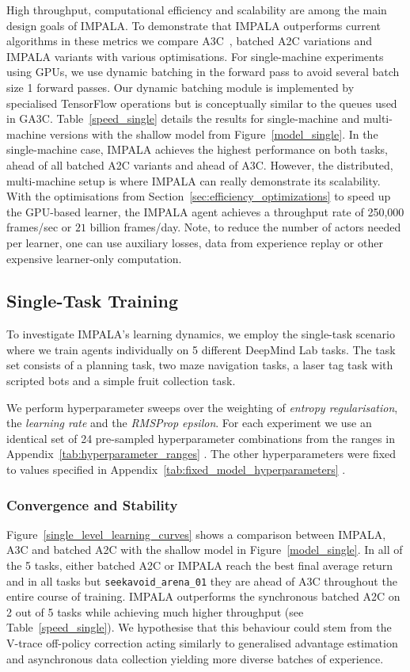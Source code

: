 High throughput, computational efficiency and scalability are among the main design goals of IMPALA.
To demonstrate that IMPALA outperforms current algorithms in these metrics we compare A3C~\cite{A3C2016}, batched A2C variations and IMPALA variants with various optimisations. For single-machine experiments using GPUs, we use dynamic batching in the forward pass to avoid several batch size 1 forward passes. Our dynamic batching module is implemented by specialised TensorFlow operations but is conceptually similar to the queues used in GA3C.
Table~\ref{speed_single} details the results for single-machine and multi-machine versions with the shallow model from Figure~\ref{model_single}.
In the single-machine case, IMPALA achieves the highest performance on both tasks, ahead of all batched A2C variants and ahead of A3C.
However, the distributed, multi-machine setup is where IMPALA can really demonstrate its scalability. With the optimisations from Section~\ref{sec:efficiency_optimizations} to speed up the GPU-based learner, the IMPALA agent achieves a throughput rate of 250,000 frames/sec or $21$ billion frames/day.
Note, to reduce the number of actors needed per learner, one can use auxiliary losses, data from experience replay or other expensive learner-only computation.


\subsection{Single-Task Training}

To investigate IMPALA's learning dynamics, we employ the single-task scenario where we train agents individually on 5 different DeepMind Lab tasks. The task set consists of a planning task, two maze navigation tasks, a laser tag task with scripted bots and a simple fruit collection task.

We perform hyperparameter sweeps over the weighting of \textit{entropy regularisation}, the \textit{learning rate} and the \textit{RMSProp epsilon}. For each experiment we use an identical set of 24 pre-sampled hyperparameter combinations from the ranges in Appendix~\ref{tab:hyperparameter_ranges}
. The other hyperparameters were fixed to values specified in Appendix~\ref{tab:fixed_model_hyperparameters}
.

\subsubsection{Convergence and Stability}


Figure~\ref{single_level_learning_curves} shows a comparison between IMPALA, A3C and batched A2C with the shallow model in Figure~\ref{model_single}.
In all of the 5 tasks, either batched A2C or IMPALA reach the best final average return and in all tasks but \texttt{seekavoid\_arena\_01} they are ahead of A3C throughout the entire course of training. IMPALA outperforms the synchronous batched A2C on 2 out of 5 tasks while achieving much higher throughput (see Table~\ref{speed_single}).
We hypothesise that this behaviour could stem from the V-trace off-policy correction acting similarly to generalised advantage estimation \cite{schulman2015high} and asynchronous data collection yielding more diverse batches of experience.

